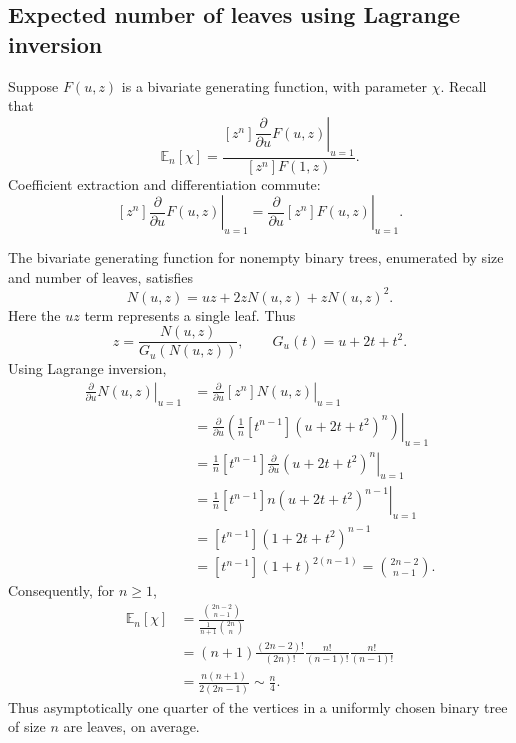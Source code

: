 \subsection{Expected number of leaves using Lagrange inversion}
Suppose $F(u,z)$ is a bivariate generating function, with parameter $\chi$. Recall that
\[
\mathbb E_n[\chi]
=\frac{[z^n]\left.\dfrac{\partial}{\partial u}F(u,z)\right|_{u=1}}
{[z^n]F(1,z)}.
\]
Coefficient extraction and differentiation commute:
\[
[z^n]\left.\frac{\partial}{\partial u}F(u,z)\right|_{u=1}
=\left.\frac{\partial}{\partial u}[z^n]F(u,z)\right|_{u=1}.
\]
\begin{example}
The bivariate generating function for nonempty binary trees, enumerated by size and number of leaves, satisfies
\[
N(u,z)=uz+2zN(u,z)+zN(u,z)^2.
\]
Here the $uz$ term represents a single leaf. Thus
\[
z=\frac{N(u,z)}{G_u(N(u,z))},\qquad G_u(t)=u+2t+t^2.
\]
Using Lagrange inversion,
\begin{align*}
[z^n]\left.\frac{\partial}{\partial u}N(u,z)\right|_{u=1}
&=\left.\frac{\partial}{\partial u}[z^n]N(u,z)\right|_{u=1}\\
&=\left.\frac{\partial}{\partial u}
\left(\frac1n[t^{n-1}](u+2t+t^2)^n\right)\right|_{u=1}\\
&=\frac1n[t^{n-1}]
\left.\frac{\partial}{\partial u}(u+2t+t^2)^n\right|_{u=1}\\
&=\frac1n[t^{n-1}]\left.n(u+2t+t^2)^{n-1}\right|_{u=1}\\
&=[t^{n-1}](1+2t+t^2)^{n-1}\\
&=[t^{n-1}](1+t)^{2(n-1)}
=\binom{2n-2}{n-1}.
\end{align*}
Consequently, for $n\ge1$,
\begin{align*}
\mathbb E_n[\chi]
&=\frac{\binom{2n-2}{n-1}}{\frac1{n+1}\binom{2n}{n}}\\
&=(n+1)\frac{(2n-2)!}{(2n)!}
\frac{n!}{(n-1)!}\frac{n!}{(n-1)!}\\
&=\frac{n(n+1)}{2(2n-1)}\sim\frac n4.
\end{align*}
Thus asymptotically one quarter of the vertices in a uniformly chosen binary tree of size $n$ are leaves, on average.
\end{example}
